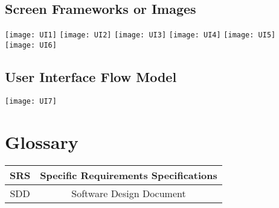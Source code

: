 \documentclass{article}
\begin{document}
\subsection{Screen Frameworks or Images}
\texttt{[image: UI1]}
\texttt{[image: UI2]}
\texttt{[image: UI3]}
\texttt{[image: UI4]}
\texttt{[image: UI5]}\\
\texttt{[image: UI6]}

\subsection{User Interface Flow Model}
\texttt{[image: UI7]}\\

\section{Glossary}
\begin{tabular}{|c|c|}
\hline
SRS & Specific Requirements Specifications\\
\hline
SDD & Software Design Document\\
\hline
\end{tabular}

\end{document}

